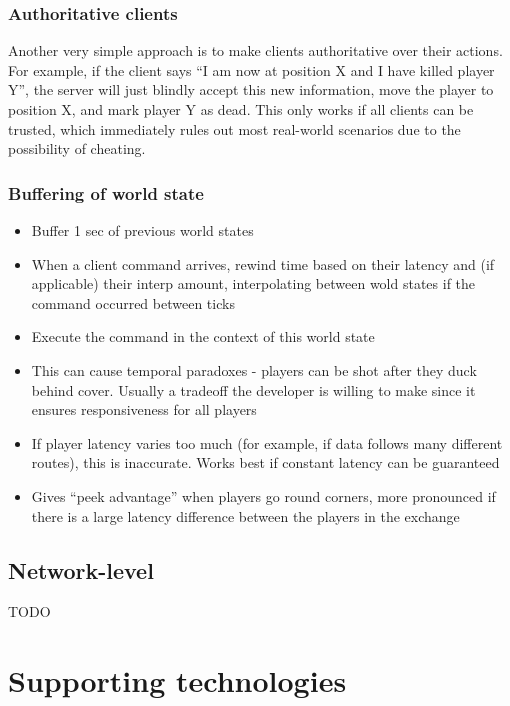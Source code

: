\documentclass[conference]{IEEEtran}
\begin{document}
	\subsubsection{Authoritative clients}

	Another very simple approach is to make clients authoritative over their actions. For example, if the client says ``I am now at position X and I have killed player Y'', the server will just blindly accept this new information, move the player to position X, and mark player Y as dead. This only works if all clients can be trusted, which immediately rules out most real-world scenarios due to the possibility of cheating.

	\subsubsection{Buffering of world state}

	\cite{bernier2001latency}

	\begin{itemize}
		\item Buffer 1 sec of previous world states
		\item When a client command arrives, rewind time based on their latency and (if applicable) their interp amount, interpolating between wold states if the command occurred between ticks
		\item Execute the command in the context of this world state
		\item This can cause temporal paradoxes - players can be shot after they duck behind cover. Usually a tradeoff the developer is willing to make since it ensures responsiveness for all players
		\item If player latency varies too much (for example, if data follows many different routes), this is inaccurate. Works best if constant latency can be guaranteed
		\item Gives ``peek advantage'' when players go round corners, more pronounced if there is a large latency difference between the players in the exchange
	\end{itemize}

	\subsection{Network-level}

	TODO \cite{yu2008latency} \cite{yu2012latency}

	\section{Supporting technologies}
\end{document}
